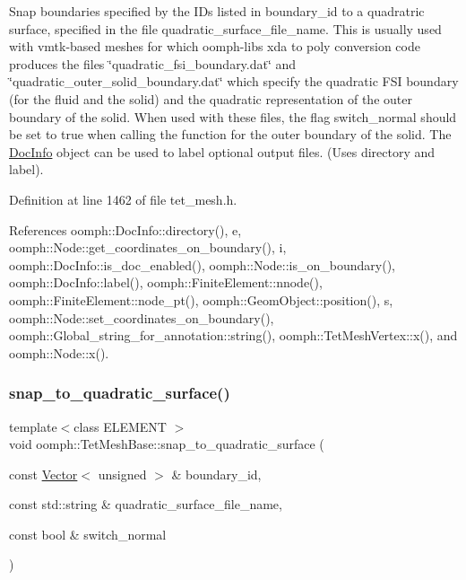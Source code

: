 Snap boundaries specified by the I\+Ds listed in boundary\+\_\+id to a quadratric surface, specified in the file quadratic\+\_\+surface\+\_\+file\+\_\+name. This is usually used with vmtk-\/based meshes for which oomph-\/lib\textquotesingle{}s xda to poly conversion code produces the files \char`\"{}quadratic\+\_\+fsi\+\_\+boundary.\+dat\char`\"{} and \char`\"{}quadratic\+\_\+outer\+\_\+solid\+\_\+boundary.\+dat\char`\"{} which specify the quadratic F\+SI boundary (for the fluid and the solid) and the quadratic representation of the outer boundary of the solid. When used with these files, the flag switch\+\_\+normal should be set to true when calling the function for the outer boundary of the solid. The \hyperlink{classoomph_1_1DocInfo}{Doc\+Info} object can be used to label optional output files. (Uses directory and label). 

Definition at line 1462 of file tet\+\_\+mesh.\+h.



References oomph\+::\+Doc\+Info\+::directory(), e, oomph\+::\+Node\+::get\+\_\+coordinates\+\_\+on\+\_\+boundary(), i, oomph\+::\+Doc\+Info\+::is\+\_\+doc\+\_\+enabled(), oomph\+::\+Node\+::is\+\_\+on\+\_\+boundary(), oomph\+::\+Doc\+Info\+::label(), oomph\+::\+Finite\+Element\+::nnode(), oomph\+::\+Finite\+Element\+::node\+\_\+pt(), oomph\+::\+Geom\+Object\+::position(), s, oomph\+::\+Node\+::set\+\_\+coordinates\+\_\+on\+\_\+boundary(), oomph\+::\+Global\+\_\+string\+\_\+for\+\_\+annotation\+::string(), oomph\+::\+Tet\+Mesh\+Vertex\+::x(), and oomph\+::\+Node\+::x().

\mbox{\label{classoomph_1_1TetMeshBase_ac067df5d8df1ab20ab6ab26ab0c52399}} 
\subsubsection{\texorpdfstring{snap\+\_\+to\+\_\+quadratic\+\_\+surface()}{snap\_to\_quadratic\_surface()}\hspace{0.1cm}{\footnotesize\ttfamily [2/2]}}
{\footnotesize\ttfamily template$<$class E\+L\+E\+M\+E\+NT $>$ \\
void oomph\+::\+Tet\+Mesh\+Base\+::snap\+\_\+to\+\_\+quadratic\+\_\+surface (\begin{DoxyParamCaption}\item[{const \hyperlink{classoomph_1_1Vector}{Vector}$<$ unsigned $>$ \&}]{boundary\+\_\+id,  }\item[{const std\+::string \&}]{quadratic\+\_\+surface\+\_\+file\+\_\+name,  }\item[{const bool \&}]{switch\+\_\+normal }\end{DoxyParamCaption})\hspace{0.3cm}{\ttfamily [inline]}}



